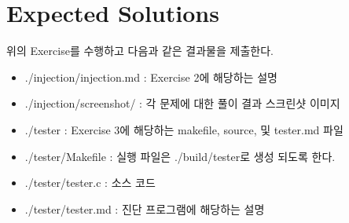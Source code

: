 \documentclass[a4paper, 11pt]{article}
\theoremstyle{definition}
\begin{document}
\section{Expected Solutions}

위의 Exercise를 수행하고 다음과 같은 결과물을 제출한다. 

\begin{itemize}
  \item ./injection/injection.md : Exercise 2에 해당하는 설명 
  \item ./injection/screenshot/ : 각 문제에 대한 풀이 결과 스크린샷 이미지 

  \item ./tester : Exercise 3에 해당하는 makefile, source, 및 tester.md 파일 
  \item ./tester/Makefile : 실행 파일은 ./build/tester로 생성 되도록 한다. 
  \item ./tester/tester.c :  소스 코드 
  \item ./tester/tester.md  : 진단 프로그램에 해당하는 설명 
\end{itemize}



\end{document}
